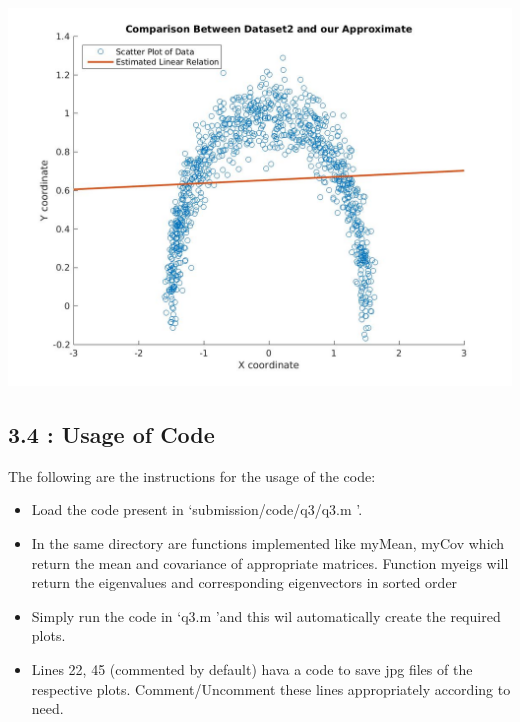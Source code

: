\documentclass[12pt, a4paper]{article}
\begin{document}
\includegraphics[width=\textwidth, height = 0.4\paperheight]{Dataset_2}
 
\subsection*{3.4 : Usage of Code}
The following are the instructions for the usage of the code:
\begin{itemize}
\item Load the code present in \lq submission/code/q3/q3.m \rq \space.
\item In the same directory are functions implemented like myMean, myCov which return the mean and covariance of appropriate matrices. Function myeigs will return the eigenvalues and corresponding eigenvectors in sorted order
\item Simply run the code in \lq q3.m \rq \space and this wil automatically create the required plots.
\item Lines 22, 45 (commented by default) hava a code to save jpg files of the respective plots. Comment/Uncomment these lines appropriately according to need.
\end{itemize}
 
 
\end{document}
